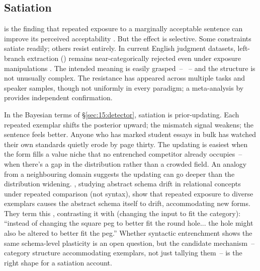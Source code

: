 \subsection{Satiation}
\label{sec:15:satiation}

 is the finding that repeated exposure to a marginally acceptable sentence can improve its perceived acceptability \parencite{snyder2000grammaticality}. But the effect is selective. Some constraints satiate readily; others resist entirely. In current English judgment datasets, left-branch extraction (\ungram{}) remains near-categorically rejected even under exposure manipulations \parencite{Snyder2022}. The intended meaning is easily grasped~-- ~-- and the structure is not unusually complex. The resistance has appeared across multiple tasks and speaker samples, though not uniformly in every paradigm; a meta-analysis by \textcite{lufrankdegen2024} provides independent confirmation.

In the Bayesian terms of §\ref{sec:15:detector}, satiation is prior-updating. Each repeated exemplar shifts the posterior upward; the mismatch signal weakens; the sentence feels better. Anyone who has marked student essays in bulk has watched their own standards quietly erode by page thirty. The updating is easiest when the form fills a value niche that no entrenched competitor already occupies~-- when there's a gap in the distribution rather than a crowded field. An analogy from a neighbouring domain suggests the updating can go deeper than the distribution widening. \textcite{vagninoWalker2026}, studying abstract schema drift in relational concepts under repeated comparison (not syntax), show that repeated exposure to diverse exemplars causes the abstract schema itself to drift, accommodating new forms. They term this , contrasting it with  (changing the input to fit the category): \enquote{instead of changing the square peg to better fit the round hole... the hole might also be altered to better fit the peg.} Whether syntactic entrenchment shows the same schema-level plasticity is an open question, but the candidate mechanism~-- category structure accommodating exemplars, not just tallying them~-- is the right shape for a satiation account.

